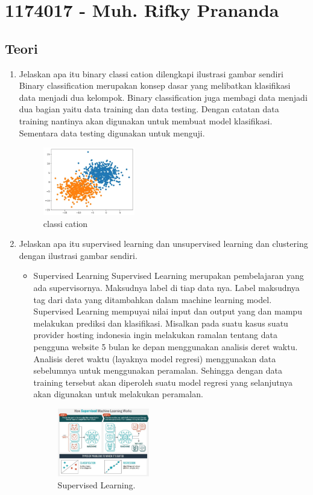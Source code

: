 \section{1174017 - Muh. Rifky Prananda}
\subsection{Teori}
\begin{enumerate}
	\item Jelaskan apa itu binary classication dilengkapi ilustrasi gambar sendiri
	\hfill\break
	Binary classification merupakan konsep dasar yang melibatkan klasifikasi data menjadi dua kelompok. Binary classification juga membagi data menjadi dua bagian yaitu data training dan data  testing. Dengan catatan data training nantinya akan digunakan untuk membuat model klasifikasi. Sementara data testing digunakan untuk menguji.
	\begin{figure}[H]
		\includegraphics[width=4cm]{figures/1174017/2/binary.PNG}
		\centering
		\caption{classication}
	\end{figure}

	\item Jelaskan apa itu supervised learning dan unsupervised learning dan clustering dengan ilustrasi gambar sendiri.
	\hfill\break


	\begin{itemize}
		\item Supervised Learning
		\hfill\break
		Supervised Learning merupakan pembelajaran yang ada supervisornya. Maksudnya label di tiap data nya. Label maksudnya tag dari data yang ditambahkan dalam machine learning model. Supervised Learning mempuyai nilai input dan output yang dan mampu melakukan prediksi dan klasifikasi. Misalkan pada suatu kasus suatu provider hosting indonesia ingin melakukan ramalan tentang data pengguna website 5 bulan ke depan menggunakan analisis deret waktu. Analisis deret waktu (layaknya model regresi) menggunakan data sebelumnya untuk menggunakan peramalan. Sehingga dengan data training tersebut akan diperoleh suatu model regresi yang selanjutnya akan digunakan untuk melakukan peramalan.
		\begin{figure}[H]
		\centering
			\includegraphics[width=4cm]{figures/1174017/2/supervisedlearning.PNG}
			\caption{Supervised Learning.}
		\end{figure}


\end{itemize}
\end{enumerate}

